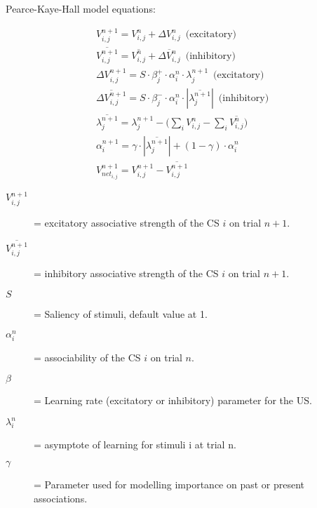 \documentclass[varwidth]{standalone}
\begin{document}
Pearce-Kaye-Hall model equations:


\begin{align}
V_{i,j}^{n+1} = V_{i,j}^n + \Delta V_{i,j}^n \,\,\,\text{(excitatory)} \\
\overline{V_{i,j}^{n+1}} = \overline{V_{i,j}^n} + \overline{\Delta V_{i,j}^n} \,\,\,\text{(inhibitory)} \\
\Delta V_{i,j}^{n+1} = S \cdot \beta_j^{+} \cdot \alpha_i^n \cdot \lambda_j^{n+1} \,\,\,\text{(excitatory)} \\
\overline{\Delta V_{i,j}^{n+1}} = S \cdot \beta_j^{-} \cdot \alpha_i^n \cdot \left| \overline{\lambda_j^{n+1}} \right| \,\,\,\text{(inhibitory)} \\
\overline{\lambda_j^{n+1}} = \lambda_j^{n+1} - \Big( \sum_i V_{i,j}^n - \sum_i \overline{V_{i,j}^n} \Big) \\
\alpha^{n+1}_i = \gamma \cdot |\overline{\lambda_j^{n+1}}| + (1-\gamma) \cdot \alpha^{n}_i \\
V_{net_{i,j}}^{n+1} = V_{i,j}^{n+1} - \overline{V_{i,j}^{n+1}}
\end{align}


\begin{description}
        \item[$V_{i,j}^{n + 1}$] = excitatory associative strength of the CS $i$ on trial $n + 1$.
        \item[$\overline{V_{i,j}^{n+1}}$] = inhibitory associative strength of the CS $i$ on trial $n + 1$.
        \item[$S$] = Saliency of stimuli, default value at 1.
	\item[$\alpha_i^{n}$] = associability of the CS $i$ on trial $n$.
        \item[$\beta$] = Learning rate (excitatory or inhibitory) parameter for the US.
	\item[$\lambda_i^n$] = asymptote of learning for stimuli i at trial n.
	
	\item[$\gamma$] = Parameter used for modelling importance on past or present associations.
\end{description} \vspace{10pt}
\end{document}
